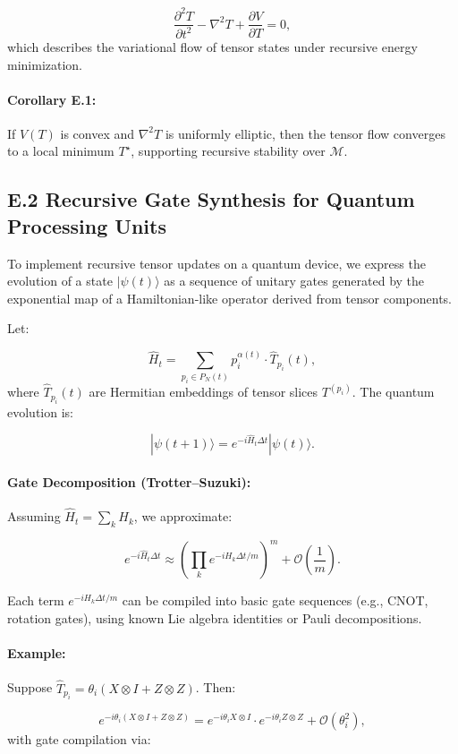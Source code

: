 \documentclass[12pt]{article}
\begin{document}
\begin{itemize}
\[
\frac{\partial^2 T}{\partial t^2} - \nabla^2 T + \frac{\partial V}{\partial T} = 0,
\]
which describes the variational flow of tensor states under recursive energy minimization.

\paragraph{Corollary E.1:}
If \(V(T)\) is convex and \(\nabla^2 T\) is uniformly elliptic, then the tensor flow converges to a local minimum \(T^\star\), supporting recursive stability over \(\mathcal{M}\).

\subsection*{E.2 Recursive Gate Synthesis for Quantum Processing Units}

To implement recursive tensor updates on a quantum device, we express the evolution of a state \(|\psi(t)\rangle\) as a sequence of unitary gates generated by the exponential map of a Hamiltonian-like operator derived from tensor components.

Let:

\[
\hat{H}_t = \sum_{p_i \in P_N(t)} p_i^{\alpha(t)} \cdot \hat{T}_{p_i}(t),
\]
where \(\hat{T}_{p_i}(t)\) are Hermitian embeddings of tensor slices \(T^{(p_i)}\). The quantum evolution is:

\[
|\psi(t+1)\rangle = e^{-i \hat{H}_t \Delta t} |\psi(t)\rangle.
\]

\paragraph{Gate Decomposition (Trotter–Suzuki):}
Assuming \(\hat{H}_t = \sum_k H_k\), we approximate:

\[
e^{-i \hat{H}_t \Delta t} \approx \left( \prod_k e^{-i H_k \Delta t / m} \right)^m + \mathcal{O}\left(\frac{1}{m}\right).
\]

Each term \(e^{-i H_k \Delta t / m}\) can be compiled into basic gate sequences (e.g., CNOT, rotation gates), using known Lie algebra identities or Pauli decompositions.

\paragraph{Example:}
Suppose \(\hat{T}_{p_i} = \theta_i (X \otimes I + Z \otimes Z)\). Then:

\[
e^{-i \theta_i (X \otimes I + Z \otimes Z)} = e^{-i \theta_i X \otimes I} \cdot e^{-i \theta_i Z \otimes Z} + \mathcal{O}(\theta_i^2),
\]
with gate compilation via:


\end{itemize}
\end{document}
